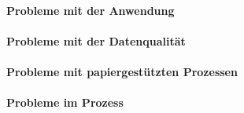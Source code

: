 
\paragraph{Probleme mit der Anwendung}

\paragraph{Probleme mit der Datenqualität}

\paragraph{Probleme mit papiergestützten Prozessen}

\paragraph{Probleme im Prozess}

